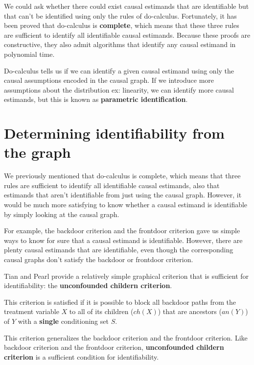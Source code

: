 We could ask whether there could exist causal estimands that are identifiable but that
can’t be identified using only the rules of do-calculus. Fortunately, it
has been proved that do-calculus is \textbf{complete}, which means that these three rules are
sufficient to identify all identifiable causal estimands. Because these proofs
are constructive, they also admit algorithms that identify any causal estimand in
polynomial time.

Do-calculus tells us if we can identify a given causal estimand using only the causal
assumptions encoded in the causal graph. If we introduce more assumptions about the
distribution ex: linearity, we can identify more causal estimands, but this is
known as \textbf{parametric identification}.

\section{Determining identifiability from the graph}
We previously mentioned that do-calculus is complete, which means that three rules are
sufficient to identify all identifiable causal estimands, also that estimands
that aren't identifiable from just using the causal graph. However, it would be much more
satisfying to know whether a causal estimand is identifiable by simply looking at the causal graph.

For example, the backdoor criterion and the frontdoor criterion gave us simple ways to know
for sure that a causal estimand is identifiable. However, there are plenty causal estimands
that are identifiable, even though the corresponding causal graphs don't satisfy the backdoor
or frontdoor criterion.

Tian and Pearl provide a relatively simple graphical criterion that is sufficient for identifiability: the \textbf{unconfounded childern criterion}.

\begin{definition}
    This criterion is satisfied if it is possible to block all backdoor paths from the
    treatment variable $X$ to all of its children ($ch(X)$) that are ancestors ($an(Y)$) of
    $Y$ with a \textbf{single} conditioning set $S$.
\end{definition}

This criterion generalizes the backdoor criterion and the frontdoor criterion. Like backdoor
criterion and the frontdoor criterion, \textbf{unconfounded childern criterion} is a sufficient
condition for identifiability.

